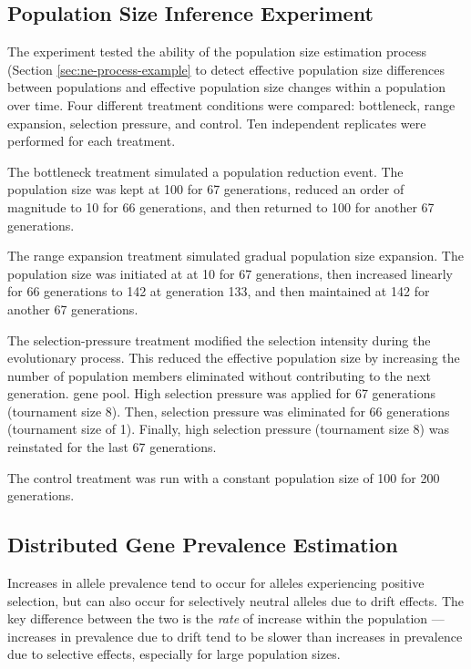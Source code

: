 \subsection{Population Size Inference Experiment}
\label{sec:population-size-inference-experiments}

The experiment tested the ability of the population size estimation process (Section \ref{sec:ne-process-example} to detect effective population size differences between populations and effective population size changes within a population over time.
Four different treatment conditions were compared: bottleneck, range expansion, selection pressure, and control.
Ten independent replicates were performed for each treatment.

The bottleneck treatment simulated a population reduction event.
The population size was kept at 100 for 67 generations, reduced an order of magnitude to 10 for 66 generations, and then returned to 100 for another 67 generations.

The range expansion treatment simulated gradual population size expansion.
The population size was initiated at at 10 for 67 generations, then increased linearly for 66 generations to 142 at generation 133, and then maintained at 142 for another 67 generations.

The selection-pressure treatment modified the selection intensity during the evolutionary process.
This reduced the effective population size by increasing the number of population members eliminated without contributing to the next generation. gene pool.
High selection pressure was applied for 67 generations (tournament size 8). Then, selection pressure was eliminated for 66 generations (tournament size of 1).
Finally, high selection pressure (tournament size 8) was reinstated for the last 67 generations.

The control treatment was run with a constant population size of 100 for 200 generations.

\subsection{Distributed Gene Prevalence Estimation}
\label{sec:dist-gene-prevalence-est}



Increases in allele prevalence tend to occur for alleles experiencing positive selection, but can also occur for selectively neutral alleles due to drift effects.
The key difference between the two is the \textit{rate} of increase within the population --- increases in prevalence due to drift tend to be slower than increases in prevalence due to selective effects, especially for large population sizes.

